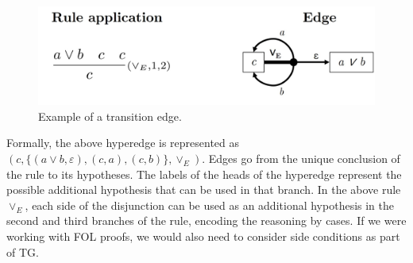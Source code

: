     \begin{figure}[h]
        \centering
        \includegraphics[width=0.8\linewidth]{resources/te-example.jpg}
        \caption{Example of a transition edge.}
        \label{fig:te-ex}
    \end{figure}

Formally, the above hyperedge is represented as $(c, \{(a \vee b, \varepsilon), (c, a), (c, b)\}, \vee_E)$. Edges go from the unique conclusion of the rule to its hypotheses. The labels of the heads of the hyperedge represent the possible additional hypothesis that can be used in that branch. In the above rule $\vee_E$, each side of the disjunction can be used as an additional hypothesis in the second and third branches of the rule, encoding the reasoning by cases. 
If we were working with FOL proofs, we would also need to consider side conditions as part of TG. 


